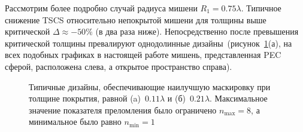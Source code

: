 Рассмотрим более подробно случай радиуса мишени ${R_1 =
  0.75\lambda}$. Типичное снижение TSCS относительно непокрытой мишени
для толщины выше критической ${\Delta \approx -50\%}$ (в два раза
ниже). Непосредственно после превышения критической толщины
превалируют однодолинные дизайны~(рисунок~\ref{img:designs}(а), на
всех подобных графиках в настоящей работе мишень, представленная PEC
сферой, расположена слева, а открытое пространство справа).
\begin{figure}
  \hfill
  \begin{minipage}[ht]{0.44\linewidth}
  \end{minipage}
  \hfill
  \begin{minipage}[ht]{0.44\linewidth}
  \end{minipage}
  \caption{Типичные дизайны, обеспечивающие наилучшую маскировку при
    толщине покрытия, равной (a)~$0.11\lambda$ и
    (б)~$0.21\lambda$. Максимальное значение показателя преломления
    было ограничено $n_{\mathrm{max}}=8$, а минимальное было
    равно $n_{\mathrm{min}}=1$ }
  \label{img:designs}  
\end{figure}
